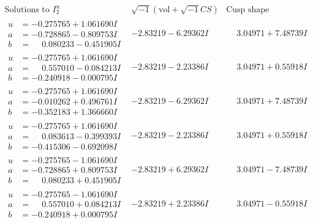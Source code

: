 \documentclass[1p]{elsarticle_modified}
\theoremstyle{definition}
\newcommand{\I}{\sqrt{-1}}
\begin{document}
$$\begin{array}{c|c|c}  
\text{Solutions to }I^u_{2}& \I (\text{vol} + \sqrt{-1}CS) & \text{Cusp shape}\\
 \hline 
\begin{aligned}
u &= -0.275765 + 1.061690 I \\
a &= -0.728865 - 0.809753 I \\
b &= \phantom{-}0.080233 - 0.451905 I\end{aligned}
 & -2.83219 - 6.29362 I & \phantom{-}3.04971 + 7.48739 I \\ \hline\begin{aligned}
u &= -0.275765 + 1.061690 I \\
a &= \phantom{-}0.557010 - 0.084213 I \\
b &= -0.240918 - 0.000795 I\end{aligned}
 & -2.83219 - 2.23386 I & \phantom{-}3.04971 + 0.55918 I \\ \hline\begin{aligned}
u &= -0.275765 + 1.061690 I \\
a &= -0.010262 + 0.496761 I \\
b &= -0.352183 + 1.366660 I\end{aligned}
 & -2.83219 - 6.29362 I & \phantom{-}3.04971 + 7.48739 I \\ \hline\begin{aligned}
u &= -0.275765 + 1.061690 I \\
a &= \phantom{-}0.083613 - 0.399393 I \\
b &= -0.415306 - 0.692098 I\end{aligned}
 & -2.83219 - 2.23386 I & \phantom{-}3.04971 + 0.55918 I \\ \hline\begin{aligned}
u &= -0.275765 - 1.061690 I \\
a &= -0.728865 + 0.809753 I \\
b &= \phantom{-}0.080233 + 0.451905 I\end{aligned}
 & -2.83219 + 6.29362 I & \phantom{-}3.04971 - 7.48739 I \\ \hline\begin{aligned}
u &= -0.275765 - 1.061690 I \\
a &= \phantom{-}0.557010 + 0.084213 I \\
b &= -0.240918 + 0.000795 I\end{aligned}
 & -2.83219 + 2.23386 I & \phantom{-}3.04971 - 0.55918 I \\ \hline\begin{aligned}

\end{aligned}
\end{array}$$
\end{document}
